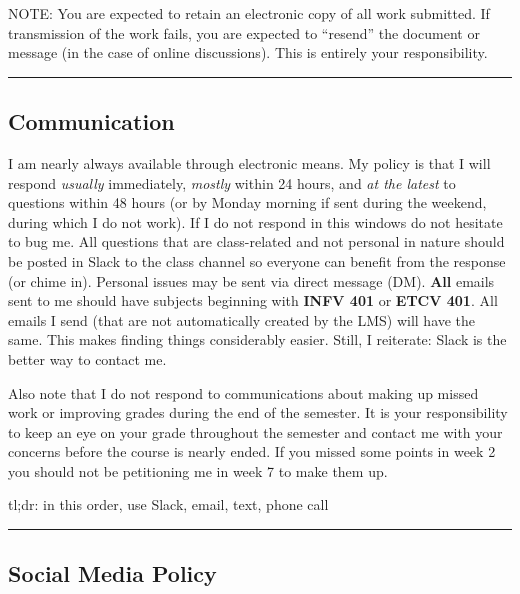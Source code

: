 \documentclass[]{article}
\begin{document}
NOTE: You are expected to retain an electronic copy of all work
submitted. If transmission of the work fails, you are expected to
``resend'' the document or message (in the case of online discussions).
This is entirely your responsibility.

\begin{center}\rule{0.5\linewidth}{\linethickness}\end{center}

\hypertarget{communication}{%
\subsection{Communication}\label{communication}}

I am nearly always available through electronic means. My policy is that
I will respond \emph{usually} immediately, \emph{mostly} within 24
hours, and \emph{at the latest} to questions within 48 hours (or by
Monday morning if sent during the weekend, during which I do not work).
If I do not respond in this windows do not hesitate to bug me. All
questions that are class-related and not personal in nature should be
posted in Slack to the class channel so everyone can benefit from the
response (or chime in). Personal issues may be sent via direct message
(DM). \textbf{All} emails sent to me should have subjects beginning with
\textbf{INFV 401} or \textbf{ETCV 401}. All emails I send (that are not
automatically created by the LMS) will have the same. This makes finding
things considerably easier. Still, I reiterate: Slack is the better way
to contact me.

Also note that I do not respond to communications about making up missed
work or improving grades during the end of the semester. It is your
responsibility to keep an eye on your grade throughout the semester and
contact me with your concerns before the course is nearly ended. If you
missed some points in week 2 you should not be petitioning me in week 7
to make them up.

tl;dr: in this order, use Slack, email, text, phone call

\begin{center}\rule{0.5\linewidth}{\linethickness}\end{center}

\hypertarget{social-media-policy}{%
\subsection{Social Media Policy}\label{social-media-policy}}
\end{document}
